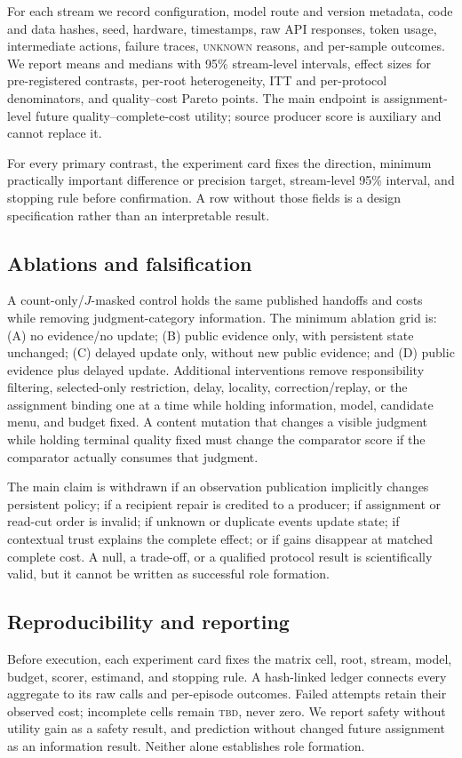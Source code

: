 \documentclass[sigconf,anonymous]{aamas}
\newcommand{\unknown}{\textsc{unknown}}
\begin{document}
For each stream we record configuration, model route and version metadata, code and data hashes, seed, hardware, timestamps, raw API responses, token usage, intermediate actions, failure traces, \unknown{} reasons, and per-sample outcomes. We report means and medians with 95\% stream-level intervals, effect sizes for pre-registered contrasts, per-root heterogeneity, ITT and per-protocol denominators, and quality--cost Pareto points. The main endpoint is assignment-level future quality--complete-cost utility; source producer score is auxiliary and cannot replace it.

For every primary contrast, the experiment card fixes the direction, minimum practically important difference or precision target, stream-level 95\% interval, and stopping rule before confirmation. A row without those fields is a design specification rather than an interpretable result.

\subsection{Ablations and falsification}
A count-only/$J$-masked control holds the same published handoffs and costs while removing judgment-category information. The minimum ablation grid is: (A) no evidence/no update; (B) public evidence only, with persistent state unchanged; (C) delayed update only, without new public evidence; and (D) public evidence plus delayed update. Additional interventions remove responsibility filtering, selected-only restriction, delay, locality, correction/replay, or the assignment binding one at a time while holding information, model, candidate menu, and budget fixed. A content mutation that changes a visible judgment while holding terminal quality fixed must change the comparator score if the comparator actually consumes that judgment.

The main claim is withdrawn if an observation publication implicitly changes persistent policy; if a recipient repair is credited to a producer; if assignment or read-cut order is invalid; if unknown or duplicate events update state; if contextual trust explains the complete effect; or if gains disappear at matched complete cost. A null, a trade-off, or a qualified protocol result is scientifically valid, but it cannot be written as successful role formation.

\subsection{Reproducibility and reporting}
Before execution, each experiment card fixes the matrix cell, root, stream, model, budget, scorer, estimand, and stopping rule. A hash-linked ledger connects every aggregate to its raw calls and per-episode outcomes. Failed attempts retain their observed cost; incomplete cells remain \textsc{tbd}, never zero. We report safety without utility gain as a safety result, and prediction without changed future assignment as an information result. Neither alone establishes role formation.
\end{document}
